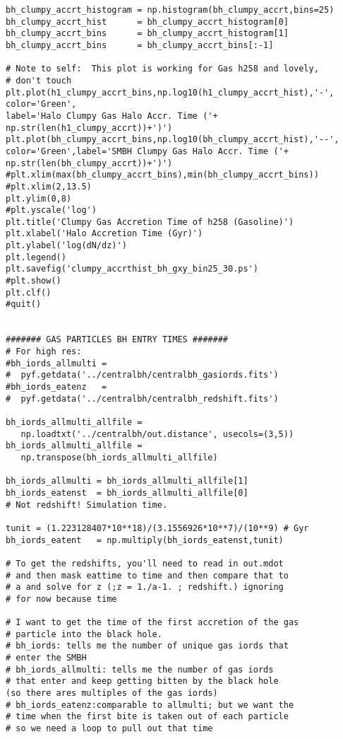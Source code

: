 \documentclass[12pt,headA,chapB]{fiskthesis}
\begin{document}
\begin{verbatim}
bh_clumpy_accrt_histogram = np.histogram(bh_clumpy_accrt,bins=25)
bh_clumpy_accrt_hist      = bh_clumpy_accrt_histogram[0]
bh_clumpy_accrt_bins      = bh_clumpy_accrt_histogram[1]
bh_clumpy_accrt_bins      = bh_clumpy_accrt_bins[:-1]

# Note to self:  This plot is working for Gas h258 and lovely, 
# don't touch
plt.plot(h1_clumpy_accrt_bins,np.log10(h1_clumpy_accrt_hist),'-',
color='Green',
label='Halo Clumpy Gas Halo Accr. Time ('+
np.str(len(h1_clumpy_accrt))+')')
plt.plot(bh_clumpy_accrt_bins,np.log10(bh_clumpy_accrt_hist),'--',
color='Green',label='SMBH Clumpy Gas Halo Accr. Time ('+
np.str(len(bh_clumpy_accrt))+')')
#plt.xlim(max(bh_clumpy_accrt_bins),min(bh_clumpy_accrt_bins))
#plt.xlim(2,13.5)
plt.ylim(0,8)
#plt.yscale('log')
plt.title('Clumpy Gas Accretion Time of h258 (Gasoline)')
plt.xlabel('Halo Accretion Time (Gyr)')
plt.ylabel('log(dN/dz)')
plt.legend()
plt.savefig('clumpy_accrthist_bh_gxy_bin25_30.ps')
#plt.show()
plt.clf()
#quit()


####### GAS PARTICLES BH ENTRY TIMES #######
# For high res:
#bh_iords_allmulti = 
#  pyf.getdata('../centralbh/centralbh_gasiords.fits')
#bh_iords_eatenz   = 
#  pyf.getdata('../centralbh/centralbh_redshift.fits')

bh_iords_allmulti_allfile = 
   np.loadtxt('../centralbh/out.distance', usecols=(3,5))
bh_iords_allmulti_allfile = 
   np.transpose(bh_iords_allmulti_allfile)

bh_iords_allmulti = bh_iords_allmulti_allfile[1]
bh_iords_eatenst  = bh_iords_allmulti_allfile[0]
# Not redshift! Simulation time.

tunit = (1.223128407*10**18)/(3.1556926*10**7)/(10**9) # Gyr
bh_iords_eatent   = np.multiply(bh_iords_eatenst,tunit)   

# To get the redshifts, you'll need to read in out.mdot 
# and then mask eattime to time and then compare that to 
# a and solve for z (;z = 1./a-1. ; redshift.) ignoring 
# for now because time

# I want to get the time of the first accretion of the gas 
# particle into the black hole. 
# bh_iords: tells me the number of unique gas iords that 
# enter the SMBH
# bh_iords_allmulti: tells me the number of gas iords 
# that enter and keep getting bitten by the black hole 
(so there ares multiples of the gas iords) 
# bh_iords_eatenz:comparable to allmulti; but we want the 
# time when the first bite is taken out of each particle 
# so we need a loop to pull out that time


\end{verbatim}
\end{document}
